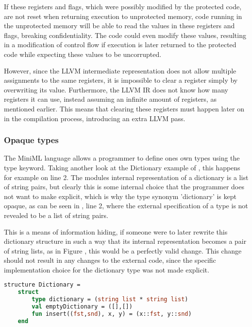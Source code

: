 If these registers and flags, which were possibly modified by the protected code, are not reset when returning execution to unprotected memory, code running in the unprotected memory will be able to read the values in these registers and flags, breaking confidentiality. The code could even modify these values, resulting in a modification of control flow if execution is later returned to the protected code while expecting these values to be uncorrupted.

However, since the LLVM intermediate representation does not allow multiple assignments to the same registers, it is impossible to clear a register simply by overwriting its value.
Furthermore, the LLVM IR does not know how many registers it can use, instead assuming an infinite amount of registers, as mentioned earlier. This means that clearing these registers must happen later on in the compilation process, introducing an extra LLVM pass.

\subsubsection{Opaque types}

The \mbox{MiniML} language allows a programmer to define ones own types using the type keyword. Taking another look at the Dictionary example of , this happens for example on line 2. The modules internal representation of a dictionary is a list of string pairs, but clearly this is some internal choice that the programmer does not want to make explicit, which is why the type synonym 'dictionary' is kept opaque, as can be seen in , line 2, where the external specification of a type is not revealed to be a list of string pairs.

This is a means of information hiding, if someone were to later rewrite this dictionary structure in such a way that its internal representation becomes a pair of string lists, as in Figure , this would be a perfectly valid change. This change should not result in any changes to the external code, since the specific implementation choice for the dictionary type was not made explicit.

\begin{lstlisting}[frame=single, language=ML, label=code:DictionaryStructureExample2,caption={An alternative structure defining a dictionary.}]
structure Dictionary =
    struct
        type dictionary = (string list * string list)
        val emptyDictionary = ([],[])
        fun insert((fst,snd), x, y) = (x::fst, y::snd)
    end
\end{lstlisting}

